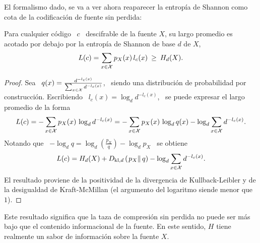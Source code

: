 El formalismo dado,  se va a ver ahora reaparecer la  entrop\'ia de Shannon como
cota de la codificaci\'on de fuente sin perdida:

\begin{teorema}
\label{Teo:SZ:CotaInferiorCodigosDescifrables}
%
  Para  cualquier c\'odigo  \  $c$ \  descifrable  de la  fuente  $X$, su  largo
  promedio es  acotado por debajo  por la entrop\'ia  de Shannon de base  $d$ de
  $X$,
  \[
  L(c) = \sum_{x \in \mathcal{X}} p_X(x) \, l_c(x) \: \ge \: H_d(X).
  \]
\end{teorema}
%
\begin{proof}
  Sea \ $q(x)  = \frac{d^{-l_c(x)}}{\sum_{x \in \mathcal{X}} d^{-l_c(x)}}$,  \ siendo una
  distribuci\'on de  probabilidad por  construcci\'on.  Escribiendo \  $l_c(x) =
  \log_d d^{-l_c(x)}$, \ se puede expresar el largo promedio de la forma
  \[
  L(c) =  - \sum_{x  \in \mathcal{X}}  p_X(x) \, \log_d  d^{-l_c(x)} =  - \sum_{x  \in \mathcal{X}}
  p_X(x) \, \log_d q(x) - \log_d \sum_{x \in \mathcal{X}} d^{-l_c(x)}.
  \]
  Notando que \ $- \log_d q  = \log_d \left( \frac{p_X}{q} \right) - \log_d p_X$
  \ se obtiene
  \[
  L(c)  = H_d(X)  + D_{\mathrm{kl},d}\left(  \left.   p_X \right\|  q \right)  -
  \log_d \sum_{x \in \mathcal{X}} d^{-l_c(x)}.
  \]
  El resultado proviene de la  positividad de la divergencia de Kullback-Leibler
  y de la desigualdad de Kraft-McMillan (el argumento del logaritmo siende menor
  que $1$).
\end{proof}
%
\noindent Este  resultado significa que la  taza de compresi\'on  sin perdida no
puede  ser m\'as  bajo que  el  contenido informacional  de la  fuente. En  este
sentido, $H$ tiene realmente un sabor de informaci\'on sobre la fuente $X$.

